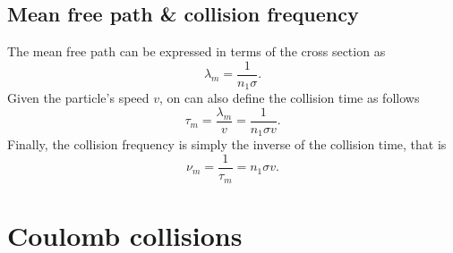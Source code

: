 \documentclass[a4paper,11pt]{report}
\begin{document}
\subsection{Mean free path \& collision frequency}
The mean free path can be expressed in terms of the cross section as
\begin{equation}
    \lambda_m = \frac{1}{n_1 \sigma}.
\end{equation}
Given the particle's speed $v$, on can also define the collision time as follows
\begin{equation}
    \tau_m = \frac{\lambda_m}{v} = \frac{1}{n_1 \sigma v}.
\end{equation}
Finally, the collision frequency is simply the inverse of the collision time, that is
\begin{equation}
    \nu_{m} = \frac{1}{\tau_m} = n_1 \sigma v.
\end{equation}

\section{Coulomb collisions}

\end{document}
